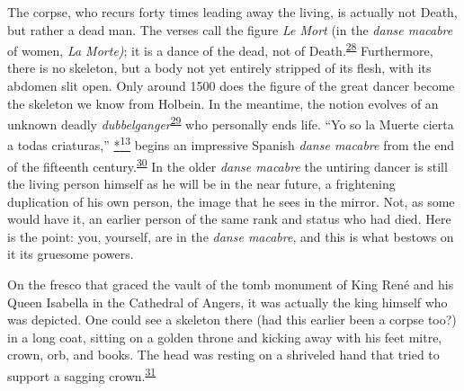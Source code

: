 The corpse, who recurs forty times leading away the living, is actually
not Death, but rather a dead man. The verses call the figure \emph{Le
Mort} (in the \emph{danse macabre} of women, \emph{La Morte)}; it is a
dance of the dead, not of
Death.\textsuperscript{\protect\hypertarget{12_Chapter_Five__THE_VISION_OF_DEAT.xhtmlux5cux23id_1296}{\protect\hyperlink{23_NOTES.xhtmlux5cux23id_1297}{28}}}
Furthermore, there is no skeleton, but a body not yet entirely stripped
of its flesh, with its abdomen slit open. Only around 1500 does the
figure of the great dancer become the skeleton we know from Holbein. In
the meantime, the notion evolves of an unknown deadly
\emph{dubbelganger}\textsuperscript{\protect\hypertarget{12_Chapter_Five__THE_VISION_OF_DEAT.xhtmlux5cux23id_1294}{\protect\hyperlink{23_NOTES.xhtmlux5cux23id_1295}{29}}}
who personally ends life. ``Yo so la Muerte cierta a todas criaturas,''
\protect\hypertarget{12_Chapter_Five__THE_VISION_OF_DEAT.xhtmlux5cux23id_2975}{\protect\hyperlink{23_NOTES.xhtmlux5cux23id_2976}{*\textsuperscript{13}}}
begins an impressive Spanish \emph{danse macabre} from the end of the
fifteenth
century.\textsuperscript{\protect\hypertarget{12_Chapter_Five__THE_VISION_OF_DEAT.xhtmlux5cux23id_1292}{\protect\hyperlink{23_NOTES.xhtmlux5cux23id_1293}{30}}}
In the older \emph{danse macabre} the untiring dancer is still the
living person himself as he will be in the near future, a frightening
duplication of his own person, the image that he sees in the mirror.
Not, as some would have it, an earlier person of the same rank and
status who had died. Here is the point: you, yourself, are in the
\emph{danse macabre}, and this is what bestows on it its gruesome
powers.

On the fresco that graced the vault of the tomb monument of King René
and his Queen Isabella in the Cathedral of Angers, it was actually the
king himself who was depicted. One could see a skeleton there (had this
earlier been a corpse too?) in a long coat, sitting on a golden throne
and kicking away with his feet mitre, crown, orb, and books. The head
was resting on a shriveled hand that tried to support a sagging
crown.\textsuperscript{\protect\hypertarget{12_Chapter_Five__THE_VISION_OF_DEAT.xhtmlux5cux23id_1290}{\protect\hyperlink{23_NOTES.xhtmlux5cux23id_1291}{31}}}

